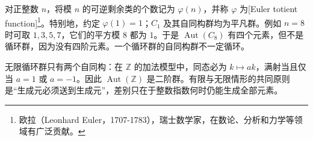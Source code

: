 \ProseParagraphBreak
对正整数 \(n\)，将模 \(n\) 的可逆剩余类的个数记为 \(\varphi(n)\)，并称 \(\varphi\) 为[Euler totient function]\footnote{欧拉（Leonhard Euler，1707-1783），瑞士数学家，在数论、分析和力学等领域有广泛贡献。}。特别地，约定 \(\varphi(1)=1\)；\(C_1\) 及其自同构群均为平凡群。例如 \(n=8\) 时可取 \(1,3,5,7\)，它们的平方模 \(8\) 都为 \(1\)。于是 \(\operatorname{Aut}(C_8)\) 有四个元素，但不是循环群，因为没有四阶元素。一个循环群的自同构群不一定循环。

\ProseParagraphBreak
无限循环群只有两个自同构：在 \(\mathbb Z\) 的加法模型中，同态必为 \(k\mapsto ak\)，满射当且仅当 \(a=1\) 或 \(a=-1\)。因此 \(\operatorname{Aut}(\mathbb Z)\) 是二阶群。有限与无限情形的共同原则是“生成元必须送到生成元”，差别只在于整数指数何时仍能生成全部元素。
